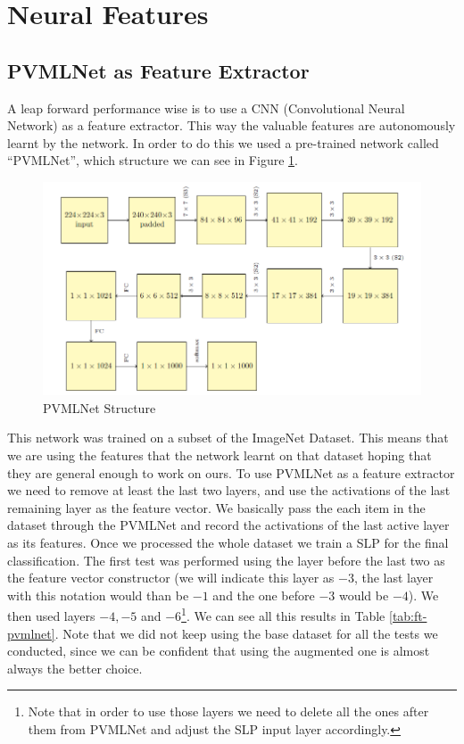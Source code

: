 \documentclass[10pt,a4paper]{report}
\begin{document}
\section{Neural Features} 
\subsection{PVMLNet as Feature Extractor}
A leap forward performance wise is to use a CNN (Convolutional Neural Network) as a feature extractor. This way the valuable features are autonomously learnt by the network. In order to do this we used a pre-trained network called \enquote{PVMLNet}, which structure we can see in Figure \ref{fig:pvmlnetstruct}.
\begin{figure}[!ht]
\centering
\includegraphics[width=0.75\linewidth]{pvmlnet.png}
\caption{PVMLNet Structure}
\label{fig:pvmlnetstruct}
\end{figure}
This network was trained on a subset of the ImageNet Dataset. This means that we are using the features that the network learnt on that dataset hoping that they are general enough to work on ours. To use PVMLNet as a feature extractor we need to remove at least the last two layers, and use the activations of the last remaining layer as the feature vector. We basically pass the each item in the dataset through the PVMLNet and record the activations of the last active layer as its features. Once we processed the whole dataset we train a SLP for the final classification. The first test was performed using the layer before the last two as the feature vector constructor (we will indicate this layer as $-3$, the last layer with this notation would than be $-1$ and the one before $-3$ would be $-4$). We then used layers $-4, -5$ and $-6$\footnote{Note that in order to use those layers we need to delete all the ones after them from PVMLNet and adjust the SLP input layer accordingly.}. We can see all this results in Table \ref{tab:ft-pvmlnet}. Note that we did not keep using the base dataset for all the tests we conducted, since we can be confident that using the augmented one is almost always the better choice.
\end{document}
